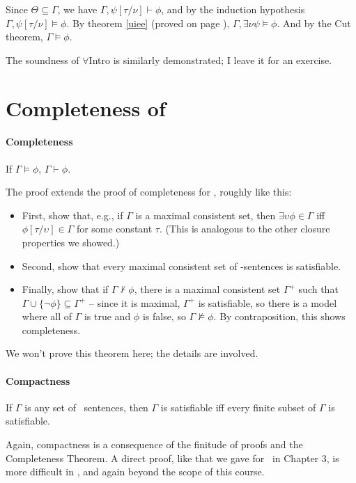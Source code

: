 Since $\Theta\subseteq\Gamma$, we have $\Gamma,\psi[\tau/\nu] \vdash \phi$, and by the induction hypothesis $\Gamma,\psi[\tau/\nu] \vDash \phi$.
By theorem \ref{uiee} (proved on page \pageref{uiee}), $\Gamma, \exists \nu\psi \vDash \phi$. And by the Cut theorem, $\Gamma\vDash \phi$.
 
The soundness of $\forall$Intro is similarly demonstrated; I leave it for an exercise.



\section{Completeness of \ltwo}
\paragraph{Completeness}

 \begin{theorem}
	If $\Gamma \vDash \phi$, $\Gamma \vdash \phi$.
\end{theorem}The proof extends the proof of completeness for \lone, roughly like this: \begin{itemize}
	\item First, show that, e.g., if $\Gamma$ is a maximal consistent set,  then $\exists \upsilon\phi \in \Gamma$ iff $\phi[\tau/\upsilon]\in \Gamma$ for some constant $\tau$. (This is analogous to the other closure properties we showed.)
	\item Second, show that every maximal consistent set of \ltwo-sentences is satisfiable.
	\item Finally, show that if $\Gamma \not\vdash\phi$, there is a maximal consistent set $\Gamma^{+}$ such that $\Gamma \cup \{\neg\phi\}\subseteq \Gamma^{+}$ – since it is maximal, $\Gamma^{+}$ is satisfiable, so there is a model where all of $\Gamma$ is true and $\phi$ is false, so $\Gamma\not\vDash\phi$. By contraposition, this shows completeness.
\end{itemize}
We won't prove this theorem here; the details are involved.

\paragraph{Compactness}

\begin{theorem}[Compactness]
	If $\Gamma$ is any set of \ltwo\ sentences, then $\Gamma$ is satisfiable iff every finite subset of $\Gamma$ is satisfiable.
\end{theorem}Again, compactness is  a consequence of the finitude of proofs and the Completeness Theorem. A direct proof, like that we gave for \lone\ in Chapter 3, is more difficult in \ltwo, and again beyond the scope of this course.


